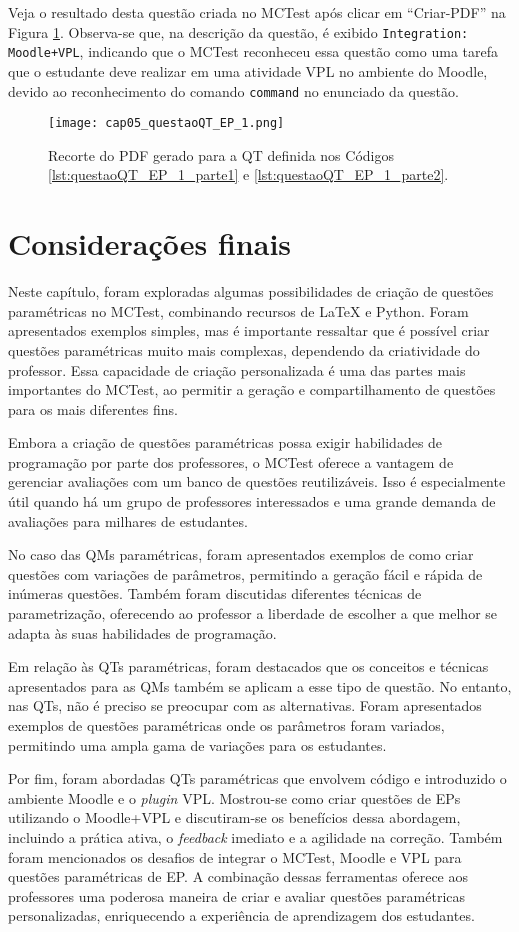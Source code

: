Veja o resultado desta questão criada no MCTest após clicar em ``Criar-PDF'' na Figura \ref{fig:cap05_questaoQT_EP_1}. Observa-se que, na descrição da questão, é exibido \verb|Integration: Moodle+VPL|, indicando que o MCTest reconheceu essa questão como uma tarefa que o estudante deve realizar em uma atividade VPL no ambiente do Moodle, devido ao reconhecimento do comando \verb|command| no enunciado da questão.

\begin{figure}[b]
  \texttt{[image: cap05\_questaoQT\_EP\_1.png]}
  \caption{Recorte do PDF gerado para a QT definida nos Códigos \ref{lst:questaoQT_EP_1_parte1} e \ref{lst:questaoQT_EP_1_parte2}.}
  \label{fig:cap05_questaoQT_EP_1}
\end{figure}


\section{Considerações finais}

Neste capítulo, foram exploradas algumas possibilidades de criação de questões paramétricas no MCTest, combinando recursos de \LaTeX{} e Python. Foram apresentados exemplos simples, mas é importante ressaltar que é possível criar questões paramétricas muito mais complexas, dependendo da criatividade do professor. Essa capacidade de criação personalizada é uma das partes mais importantes do MCTest, ao permitir a geração e compartilhamento de questões para os mais diferentes fins.

Embora a criação de questões paramétricas possa exigir habilidades de programação por parte dos professores, o MCTest oferece a vantagem de gerenciar avaliações com um banco de questões reutilizáveis. Isso é especialmente útil quando há um grupo de professores interessados e uma grande demanda de avaliações para milhares de estudantes. 

No caso das QMs paramétricas, foram apresentados exemplos de como criar questões com variações de parâmetros, permitindo a geração fácil e rápida de inúmeras questões. Também foram discutidas diferentes técnicas de parametrização, oferecendo ao professor a liberdade de escolher a que melhor se adapta às suas habilidades de programação.

Em relação às QTs paramétricas, foram destacados que os conceitos e técnicas apresentados para as QMs também se aplicam a esse tipo de questão. No entanto, nas QTs, não é preciso se preocupar com as alternativas. Foram apresentados exemplos de questões paramétricas onde os parâmetros foram variados, permitindo uma ampla gama de variações para os estudantes.

Por fim, foram abordadas QTs paramétricas que envolvem código e introduzido o ambiente Moodle e o \textit{plugin} VPL. Mostrou-se como criar questões de EPs utilizando o Moodle+VPL e discutiram-se os benefícios dessa abordagem, incluindo a prática ativa, o \textit{feedback} imediato e a agilidade na correção. Também foram mencionados os desafios de integrar o MCTest, Moodle e VPL para questões paramétricas de EP. A combinação dessas ferramentas oferece aos professores uma poderosa maneira de criar e avaliar questões paramétricas personalizadas, enriquecendo a experiência de aprendizagem dos estudantes.